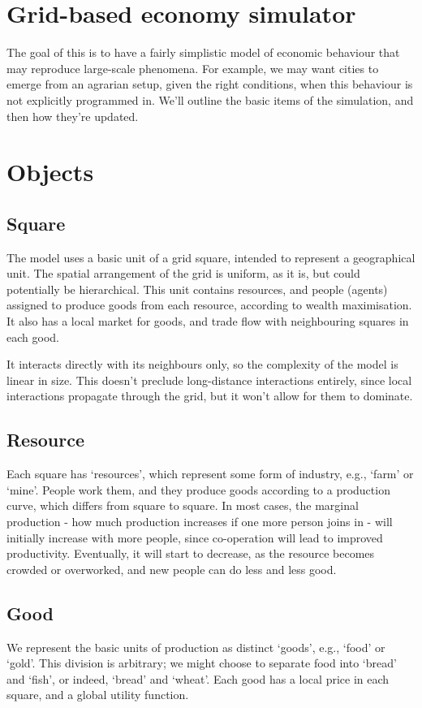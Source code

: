 \documentclass[12pt]{article}
\begin{document}
	
	\section*{Grid-based economy simulator}
	The goal of this is to have a fairly simplistic model of economic behaviour that may reproduce large-scale phenomena.
	For example, we may want cities to emerge from an agrarian setup, given the right conditions, when this behaviour is not explicitly programmed in. We'll outline the basic items of the simulation, and then how they're updated.
	
	\section{Objects}
	
		\subsection{Square}
		The model uses a basic unit of a grid square, intended to represent a geographical unit. The spatial arrangement of the grid is uniform, as it is, but could potentially be hierarchical.
		This unit contains resources, and people (agents) assigned to produce goods from each resource, according to wealth maximisation.
		It also has a local market for goods, and trade flow with neighbouring squares in each good.
		
		It interacts directly with its neighbours only, so the complexity of the model is linear in size. 
		This doesn't preclude long-distance interactions entirely, since local interactions propagate through the grid, but it won't allow for them to dominate.
		
		\subsection{Resource}
		Each square has `resources', which represent some form of industry, e.g., `farm' or `mine'.
		People work them, and they produce goods according to a production curve, which differs from square to square. 
		In most cases, the marginal production - how much production increases if one more person joins in - will initially increase with more people, since co-operation will lead to improved productivity.
		Eventually, it will start to decrease, as the resource becomes crowded or overworked, and new people can do less and less good.
	
		\subsection{Good}
		We represent the basic units of production as distinct `goods', e.g., `food' or `gold'.
		This division is arbitrary; we might choose to separate food into `bread' and `fish', or indeed, `bread' and `wheat'.
		Each good has a local price in each square, and a global utility function.
		
\end{document}
